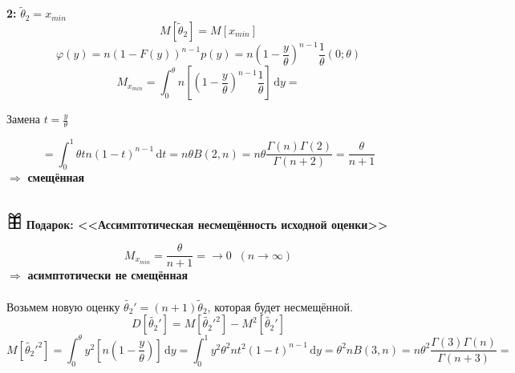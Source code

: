 \vspace{2.5 mm}
\textbf{2:}
$\tilde\theta_2 = x_{min}$
\begin{equation*}
    M\left[ \tilde\theta_2 \right] = M\left[ x_{min} \right]
\end{equation*}
\begin{equation*}
    \varphi(y) = n\left(1-F(y)  \right)^{n-1} p(y) = n\left(1 - \frac{y}{\theta}\right)^{n-1}\frac{1}{\theta}(0;\theta)
\end{equation*}
\begin{equation*}
    M_{x_{min}} = \int_{0}^{\theta}n\left[\left(1 - \frac{y}{\theta}\right)^{n-1}\frac{1}{\theta}\right]\,\mathrm{d}y =
\end{equation*}
\begin{center}
    Замена $ t = \frac{y}{\theta}$ 
\end{center}
\begin{equation*}
    = \int_{0}^{1}\theta tn(1 - t)^{n-1}\,\mathrm{d}t = n\theta B(2,n) = n\theta \frac{\Gamma(n)\Gamma(2)}{\Gamma(n+2)} = \frac{\theta}{n+1} 
\end{equation*} 
$\Rightarrow$ \textbf{смещённая} \\
\vspace{1.5mm}\\
\begin{flushleft}
    \includegraphics[width=0.04\textwidth]{images/present.png} 
    \textbf{Подарок: <<Ассимптотическая несмещённость исходной оценки>>}
\end{flushleft}
\begin{equation*}
    M_{x_{min}} = \frac{\theta}{n+1} = \to 0 \;\;(n\to\infty)
\end{equation*}
$\Rightarrow$ \textbf{асимптотически не смещённая} \\
\vspace{1.5mm}\\
Возьмем новую оценку $\tilde{\theta_2}' = (n+1)\tilde\theta_2$, которая будет несмещённой.
\vspace{2.5 mm}\\
\begin{equation*}
    D\left[\tilde{\theta_2}' \right] = M\left[\tilde{\theta_2}'^2 \right] - M^2\left[\tilde{\theta_2}' \right]
\end{equation*}
\begin{equation*}
    M\left[\tilde{\theta_2}'^2 \right] = \int_{0}^{\theta}y^2\left[ n\left(1-\frac{y}{\theta}\right)\right]\,\mathrm{d}y = 
    \int_{0}^{1}y^2 \theta^2nt^2\left(1-t\right)^{n-1}\,\mathrm{d}y = \theta^2n B(3, n) = n\theta^2\frac{\Gamma(3)\Gamma(n)}{\Gamma(n+3)} =
\end{equation*}
